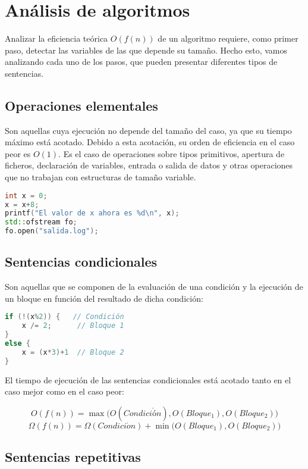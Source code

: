 \section{Análisis de algoritmos}

Analizar la eficiencia teórica $O(f(n))$ de un algoritmo requiere, como primer paso, detectar las variables de las que depende su tamaño.
Hecho esto, vamos analizando cada uno de los pasos, que pueden presentar diferentes tipos de sentencias.

\subsection{Operaciones elementales}

Son aquellas cuya ejecución no depende del tamaño del caso, ya que su tiempo máximo está acotado.
Debido a esta acotación, su orden de eficiencia en el caso peor es $O(1)$.
Es el caso de operaciones sobre tipos primitivos, apertura de ficheros, declaración de variables, entrada o salida de datos y otras operaciones que no trabajan con estructuras de tamaño variable.

\begin{lstlisting}[language=C++]
int x = 0;
x = x+8;
printf("El valor de x ahora es %d\n", x);
std::ofstream fo;
fo.open("salida.log");
\end{lstlisting}

\subsection{Sentencias condicionales}\label{condicionales}

Son aquellas que se componen de la evaluación de una condición y la ejecución de un bloque en función del resultado de dicha condición:

\begin{lstlisting}[language=C]
if (!(x%2)) {   // Condición
	x /= 2;      // Bloque 1
}
else {
	x = (x*3)+1  // Bloque 2
}
\end{lstlisting}

El tiempo de ejecución de las sentencias condicionales está acotado tanto en el caso mejor como en el caso peor:

\[O(f(n))=\max\big(O(Condici\acute{ó}n),O(Bloque_1),O(Bloque_2)\big)\]
\[\Omega(f(n))=\Omega(Condici\acute{o}n)+\min\big(O(Bloque_1),O(Bloque_2)\big)\]

\subsection{Sentencias repetitivas}\label{repetitivas}

